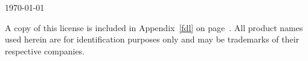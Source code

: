{
\null\vfill
\thispagestyle{empty}
\noindent\today\par\medskip
\license A copy of this license is included in Appendix~\ref{fdl} on page~\pageref{fdl}.
All product names used herein are for identification purposes only and may be trademarks of their respective companies.
\concludechapter
\frontmatter
\setcounter{tocdepth}{1}
\tableofcontents
\setcounter{tocdepth}{2}
\concludechapter
\listoffigures
\concludechapter
\listoftables
\concludechapter
}

\providecommand{\concludebook}{
\backmatter
\addtocontents{toc}{\protect\setcounter{tocdepth}{-1}}
\phantomsection\addcontentsline{toc}{part}{Bibliography}

\concludechapter
\phantomsection\addcontentsline{toc}{part}{Indexes}
\printindex
\concludechapter
\indexprologue{\label{idx:tools}}
\printindex[tools]
\concludechapter
\printindex[library]
\concludechapter
\indexprologue{\label{idx:runtime}}
\printindex[runtime]
\concludechapter
\indexprologue{\label{idx:environment}}
\printindex[environment]
\concludechapter
\pagestyle{empty}\pagenumbering{Alph}\null\clearpage
\null\vfill\centering\ecslogo{4em}\par\medskip\license

}


